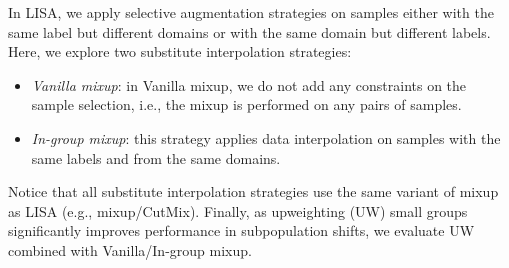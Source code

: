 \begin{table*}[h]
\small
\caption{Results of the analysis of learned invariant predictors. Accuracy of domain prediction ($\mathrm{IP}_{adp}$) and pairwise divergence of prediction among all domains ($\mathrm{IP}_{kl}$) are used to measure the invariance. Smaller values denote stronger invariance.}
\label{tab:prediction_invariance}
\begin{center}
\vspace{-2em}
\end{center}
\end{table*}

\label{sec:exp_compare_augmentation}
In LISA, we apply selective augmentation strategies on samples either with the same label but different domains or with the same domain but different labels. Here, we explore two substitute interpolation strategies: 
\begin{itemize}[leftmargin=*]
    \item \emph{Vanilla mixup}: in Vanilla mixup, we do not add any constraints on the sample selection, i.e., the mixup is performed on any pairs of samples.
    \item \emph{In-group mixup}: this strategy applies data interpolation on samples with the same labels and from the same domains. 
\end{itemize}
Notice that all substitute interpolation strategies use the same variant of mixup as LISA (e.g., mixup/CutMix). Finally, as upweighting (UW) small groups significantly improves performance in subpopulation shifts, we evaluate UW combined with Vanilla/In-group mixup.

